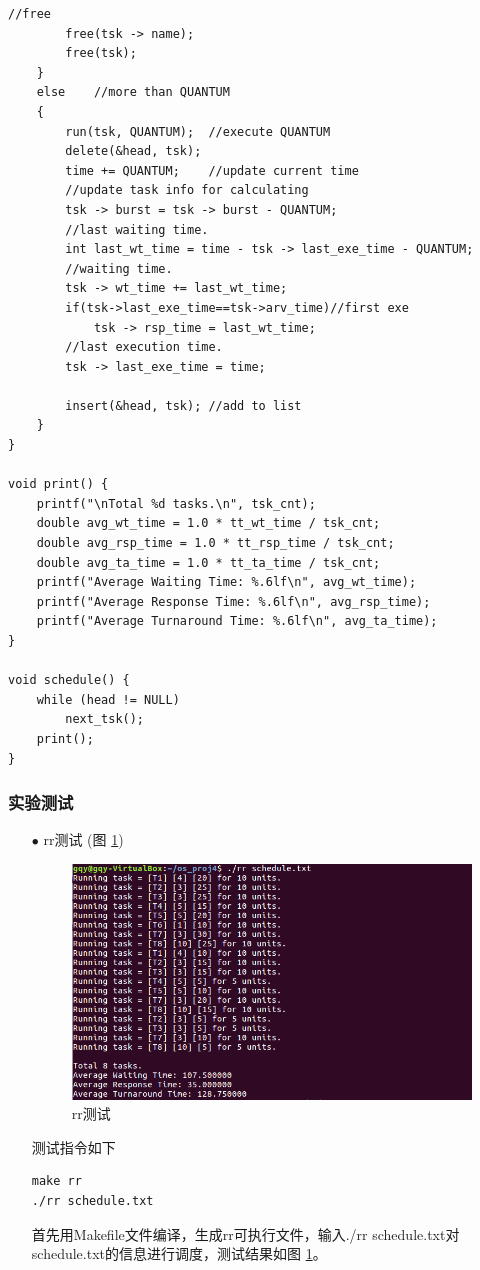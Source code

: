 \documentclass{article}
\begin{document}
\begin{lstlisting}[language={[ANSI]C}]
		//free
		free(tsk -> name);
		free(tsk);
	}
	else	//more than QUANTUM
	{
		run(tsk, QUANTUM);	//execute QUANTUM
		delete(&head, tsk);
		time +=	QUANTUM;	//update current time
		//update task info for calculating
		tsk -> burst = tsk -> burst - QUANTUM;
		//last waiting time.
		int last_wt_time = time - tsk -> last_exe_time - QUANTUM;
		//waiting time.	
		tsk -> wt_time += last_wt_time;
		if(tsk->last_exe_time==tsk->arv_time)//first exe
			tsk -> rsp_time = last_wt_time;
		//last execution time.	
		tsk -> last_exe_time = time;
		
		insert(&head, tsk);	//add to list
	}
}

void print() {
	printf("\nTotal %d tasks.\n", tsk_cnt);
	double avg_wt_time = 1.0 * tt_wt_time / tsk_cnt;
	double avg_rsp_time = 1.0 * tt_rsp_time / tsk_cnt;
	double avg_ta_time = 1.0 * tt_ta_time / tsk_cnt;
	printf("Average Waiting Time: %.6lf\n", avg_wt_time);
	printf("Average Response Time: %.6lf\n", avg_rsp_time);
	printf("Average Turnaround Time: %.6lf\n", avg_ta_time);
}

void schedule() {
	while (head != NULL)
		next_tsk();
	print();
}
\end{lstlisting}
\subsubsection{实验测试}
\begin{itemize}
\item[$\bullet$]rr测试 (图 \ref{rr测试})
\begin{figure}[htbp]
		\centering
		\includegraphics{rr}
		\caption{rr测试} \label{rr测试}
\end{figure}

测试指令如下
\begin{lstlisting}[language={[ANSI]C}]
make rr
./rr schedule.txt
\end{lstlisting}
首先用Makefile文件编译，生成rr可执行文件，输入./rr schedule.txt对schedule.txt的信息进行调度，测试结果如图 \ref{rr测试}。
\end{itemize}
\end{document}
